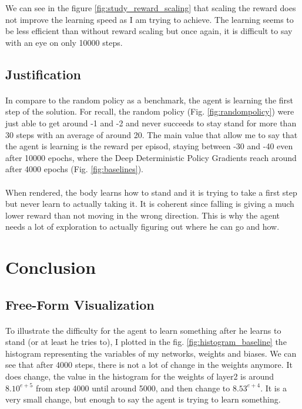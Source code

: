 \documentclass{article}
\begin{document}
We can see in the figure \ref{fig:study_reward_scaling} that scaling the reward
does not improve the learning speed as I am trying to achieve. The learning
seems to be less efficient than without reward scaling but once again, it is
difficult to say with an eye on only 10000 steps.

\subsection{Justification}
\paragraph{}

In compare to the random policy as a benchmark, the agent is learning the first
step of the solution. For recall, the random policy (Fig.
\ref{fig:randompolicy}) were just able to get around -1 and -2 and never
succeeds to stay stand for more than 30 steps with an average of around 20.
The main value that allow me to say that the agent is
learning is the reward per episod, staying between -30 and -40 even after 10000
epochs, where the Deep Deterministic Policy Gradients reach around after 4000
epochs (Fig. \ref{fig:baselines}).

\paragraph{}
When rendered, the body learns how to stand and it is trying to take a first
step but never learn to actually taking it. It is coherent since falling is
giving a much lower reward than not moving in the wrong direction. This is why
the agent needs a lot of exploration to actually figuring out where he can go
and how.

\newpage
\section{Conclusion}

\subsection{Free-Form Visualization}

\paragraph{}
To illustrate the difficulty for the agent to learn something after he learns
to stand (or at least he tries to), I plotted in the fig.
\ref{fig:histogram_baseline} the histogram representing the variables of my
networks, weights and biases. We can see that after 4000 steps, there is not a
lot of change in the weights anymore. It does change, the value in the histogram
for the weights of layer2 is around $8.10^{e+5}$ from step 4000 until around
5000, and then change to $8.53^{e+4}$. It is a very small change, but enough to
say the agent is trying to learn something.
\end{document}
